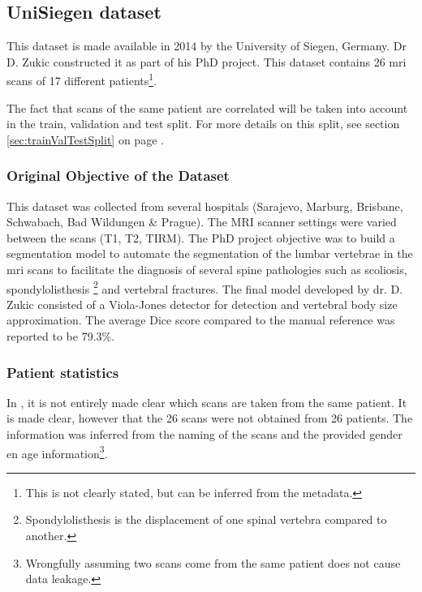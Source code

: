 

\subsection{UniSiegen dataset\label{sec:DataUSiegen}}

This dataset is made available in 2014 by the University of Siegen, Germany.
Dr D. Zukic \cite{Zukic2014} constructed it as part of his PhD project.
This dataset contains 26 \acrshort{mri} scans of 17 different patients\footnote{This is not clearly stated, but can be inferred from the metadata.}. 

The fact that scans of the same patient are correlated will be taken into account in the train, validation and test split.
For more details on this split, see section \ref{sec:trainValTestSplit} on page \pageref{sec:trainValTestSplit}.


\subsubsection{Original Objective of the Dataset}

This dataset was collected from several hospitals (Sarajevo, Marburg, Brisbane, Schwabach, Bad Wildungen \& Prague). The MRI scanner settings were varied between the scans (T1, T2, TIRM).
The PhD project objective was to build a segmentation model to automate the segmentation of the lumbar vertebrae in the \acrshort{mri} scans to facilitate the diagnosis of several spine pathologies 
such as scoliosis, spondylolisthesis \footnote{Spondylolisthesis is the displacement of one spinal vertebra compared to another.} and vertebral fractures.
The final model developed by dr. D. Zukic consisted of a Viola-Jones detector for detection and vertebral body size approximation.
The average Dice score compared to the manual reference was reported to be 79.3\%.

\subsubsection{Patient statistics}
In \cite{Zukic2014}, it is not entirely made clear which scans are taken from the same patient.
It is made clear, however that the 26 scans were not obtained from 26 patients.
The information was inferred from the naming of the scans and the provided gender en age information\footnote{
    Wrongfully assuming two scans come from the same patient does not cause data leakage.
}.

